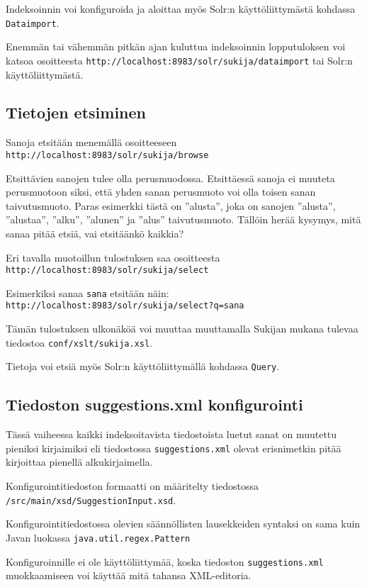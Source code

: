 \documentclass[12pt]{article}
\begin{document}
Indeksoinnin voi konfiguroida ja aloittaa myös Solr:n käyttöliittymästä
kohdassa \verb|Dataimport|.

Enemmän tai vähemmän pitkän ajan kuluttua indeksoinnin lopputuloksen
voi katsoa osoitteesta
\verb|http://localhost:8983/solr/sukija/dataimport|
tai Solr:n käyttöliittymästä.


\subsection*{Tietojen etsiminen}

Sanoja etsitään menemällä osoitteeseen
\verb=http://localhost:8983/solr/sukija/browse=

Etsittävien sanojen tulee olla perusmuodossa. Etsittäessä sanoja ei
muuteta perusmuotoon siksi, että yhden sanan perusmuoto voi olla
toisen sanan taivutusmuoto. Paras esimerkki tästä on ''alusta'', joka
on sanojen ''alusta'', ''alustaa'', ''alku'', ''alunen'' ja ''alus''
taivutusmuoto. Tällöin herää kysymys, mitä sanaa pitää etsiä, vai
etsitäänkö kaikkia?


Eri tavalla muotoillun tulostuksen saa osoitteesta
\verb=http://localhost:8983/solr/sukija/select=

Esimerkiksi sanaa \verb=sana= etsitään näin:
\verb|http://localhost:8983/solr/sukija/select?q=sana|

Tämän tulostuksen ulkonäköä voi muuttaa muuttamalla Sukijan mukana
tulevaa tiedostoa \verb=conf/xslt/sukija.xsl=.

Tietoja voi etsiä myös Solr:n käyttöliittymällä kohdassa \verb|Query|.


\subsection*{Tiedoston suggestions.xml konfigurointi}

Tässä vaiheessa kaikki indeksoitavista tiedostoista luetut sanat on
muutettu pieniksi kirjaimiksi eli tiedostossa
\verb|suggestions.xml| olevat erisnimetkin pitää kirjoittaa
pienellä alkukirjaimella.

Konfigurointitiedoston formaatti on määritelty tiedostossa
\verb=/src/main/xsd/SuggestionInput.xsd=.

Konfigurointitiedostossa olevien säännöllisten lausekkeiden syntaksi on
sama kuin Javan luokassa \verb=java.util.regex.Pattern=

Konfiguroinnille ei ole käyttöliittymää, koska tiedoston
\verb=suggestions.xml= muokkaamiseen voi käyttää mitä tahansa
XML-editoria.
\end{document}
